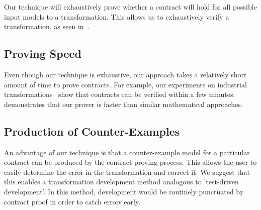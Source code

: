 Our technique will exhaustively prove whether a contract will hold for all possible input models to a transformation. This allows us to exhaustively verify a transformation, as seen in~\cite{Lucio2014}.

\subsection{Proving Speed}

 Even though our technique is exhaustive, our approach takes a relatively short amount of time to prove contracts. For example, our experiments on industrial transformations~\cite{Oakes} show that contracts can be verified within a few minutes. \cite{Selim2014} demonstrates that our prover is faster than similar mathematical approaches.

\subsection{Production of Counter-Examples}

An advantage of our technique is that a counter-example model for a particular contract can be produced by the contract proving process. This allows the user to easily determine the error in the transformation and correct it. We suggest that this enables a transformation development method analogous to 'test-driven development'. In this method, development would be routinely punctuated by contract proof in order to catch errors early.

 